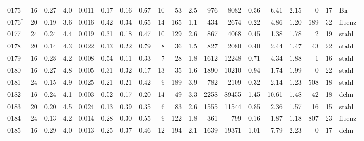 {\begin{longtable}{@{}lrrrrrrrrrrrrrrrrrl@{}}
0175 & 16 & \num{0.27} & \num{4.0} & \num{0.011} & \num{0.17} & \num{0.16} & \num{0.67} & 10 & \num{53} & \num{2.5} & \num{976} & \num{8082} & \num{0.56} & \num{6.41} & \num{2.15} & \num{0} & \num{17} & Bn \\
0176$^\ast$ & 20 & \num{0.19} & \num{3.6} & \num{0.016} & \num{0.42} & \num{0.34} & \num{0.65} & 14 & \num{165} & \num{1.1} & \num{434} & \num{2674} & \num{0.22} & \num{4.86} & \num{1.20} & \num{689} & \num{32} & fluenz \\
0177 & 24 & \num{0.24} & \num{4.4} & \num{0.019} & \num{0.31} & \num{0.18} & \num{0.47} & 10 & \num{129} & \num{2.6} & \num{867} & \num{4068} & \num{0.45} & \num{1.38} & \num{1.78} & \num{2} & \num{19} & stahl \\
0178 & 20 & \num{0.14} & \num{4.3} & \num{0.022} & \num{0.13} & \num{0.22} & \num{0.79} & 8 & \num{36} & \num{1.5} & \num{827} & \num{2080} & \num{0.40} & \num{2.44} & \num{1.47} & \num{43} & \num{22} & stahl \\
0179 & 16 & \num{0.28} & \num{4.2} & \num{0.008} & \num{0.54} & \num{0.11} & \num{0.33} & 7 & \num{28} & \num{1.8} & \num{1612} & \num{12248} & \num{0.71} & \num{4.34} & \num{1.88} & \num{1} & \num{16} & stahl \\
0180 & 16 & \num{0.27} & \num{4.8} & \num{0.005} & \num{0.31} & \num{0.32} & \num{0.17} & 13 & \num{35} & \num{1.6} & \num{1890} & \num{10210} & \num{0.94} & \num{1.74} & \num{1.99} & \num{0} & \num{22} & stahl \\
0181 & 24 & \num{0.15} & \num{4.9} & \num{0.025} & \num{0.21} & \num{0.21} & \num{0.42} & 9 & \num{189} & \num{3.9} & \num{782} & \num{2109} & \num{0.32} & \num{2.14} & \num{1.23} & \num{508} & \num{18} & stahl \\
0182 & 16 & \num{0.24} & \num{4.1} & \num{0.003} & \num{0.52} & \num{0.17} & \num{0.20} & 14 & \num{49} & \num{3.3} & \num{2258} & \num{89455} & \num{1.45} & \num{10.61} & \num{1.48} & \num{42} & \num{18} & dehn \\
0183 & 20 & \num{0.20} & \num{4.5} & \num{0.024} & \num{0.13} & \num{0.39} & \num{0.35} & 6 & \num{83} & \num{2.6} & \num{1555} & \num{11544} & \num{0.85} & \num{2.36} & \num{1.57} & \num{16} & \num{15} & stahl \\
0184 & 24 & \num{0.13} & \num{4.2} & \num{0.014} & \num{0.28} & \num{0.30} & \num{0.55} & 9 & \num{122} & \num{1.8} & \num{361} & \num{799} & \num{0.16} & \num{1.87} & \num{1.18} & \num{807} & \num{23} & fluenz \\
0185 & 16 & \num{0.29} & \num{4.0} & \num{0.013} & \num{0.25} & \num{0.37} & \num{0.46} & 12 & \num{194} & \num{2.1} & \num{1639} & \num{19371} & \num{1.01} & \num{7.79} & \num{2.23} & \num{0} & \num{17} & dehn \\

\end{longtable}}
